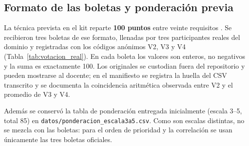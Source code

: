 ﻿\subsection{Formato de las boletas y ponderación previa}

La técnica prevista en el kit reparte \textbf{100 puntos} entre veinte requisitos \cite{wiegers2013}. Se recibieron tres boletas de ese formato, llenadas por tres participantes reales del dominio y registradas con los códigos anónimos V2, V3 y V4 (Tabla~\ref{tab:votacion_real}). En cada boleta los valores son enteros, no negativos y la suma es exactamente 100. Los originales se custodian fuera del repositorio y pueden mostrarse al docente; en el manifiesto se registra la huella del CSV transcrito y se documenta la coincidencia aritmética observada entre V2 y el promedio de V3 y V4.

Además se conservó la tabla de ponderación entregada inicialmente (escala 3--5, total 85) en \texttt{datos/ponderacion\_escala3a5.csv}. Como son escalas distintas, no se mezcla con las boletas: para el orden de prioridad y la correlación se usan únicamente las tres boletas oficiales.

